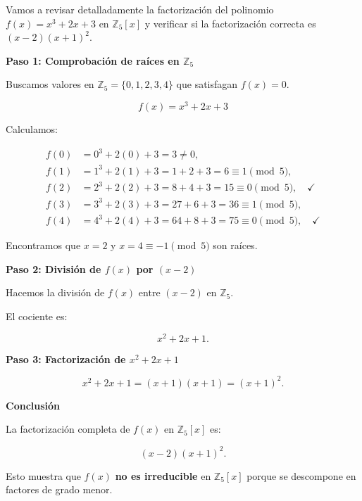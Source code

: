 \noindent
Vamos a revisar detalladamente la factorización del polinomio \( f(x) = x^3 + 2x + 3 \) en \( \mathbb{Z}_5[x] \) y verificar si la factorización correcta es \( (x - 2)(x + 1)^2 \).

\smallskip

\textbf{Paso 1: Comprobación de raíces en \( \mathbb{Z}_5 \)}

Buscamos valores en \( \mathbb{Z}_5 = \{0,1,2,3,4\} \) que satisfagan \( f(x) = 0 \).

\[
f(x) = x^3 + 2x + 3
\]

Calculamos:

\[
\begin{aligned}
    f(0) &= 0^3 + 2(0) + 3 = 3 \neq 0, \\
    f(1) &= 1^3 + 2(1) + 3 = 1 + 2 + 3 = 6 \equiv 1 \pmod{5}, \\
    f(2) &= 2^3 + 2(2) + 3 = 8 + 4 + 3 = 15 \equiv 0 \pmod{5}, \quad \checkmark \\
    f(3) &= 3^3 + 2(3) + 3 = 27 + 6 + 3 = 36 \equiv 1 \pmod{5}, \\
    f(4) &= 4^3 + 2(4) + 3 = 64 + 8 + 3 = 75 \equiv 0 \pmod{5}, \quad \checkmark
\end{aligned}
\]

Encontramos que \( x = 2 \) y \( x = 4 \equiv -1 \pmod{5} \) son raíces.

\smallskip

\textbf{Paso 2: División de \( f(x) \) por \( (x - 2) \)}

Hacemos la división de \( f(x) \) entre \( (x - 2) \) en \( \mathbb{Z}_5 \).

El cociente es:

\[
x^2 + 2x + 1.
\]

\smallskip

\textbf{Paso 3: Factorización de \( x^2 + 2x + 1 \)}

\[
x^2 + 2x + 1 = (x + 1)(x + 1) = (x + 1)^2.
\]

\smallskip

\textbf{Conclusión}

La factorización completa de \( f(x) \) en \( \mathbb{Z}_5[x] \) es:

\[
(x - 2)(x + 1)^2.
\]

Esto muestra que \( f(x) \) \textbf{no es irreducible} en \( \mathbb{Z}_5[x] \) porque se descompone en factores de grado menor.
